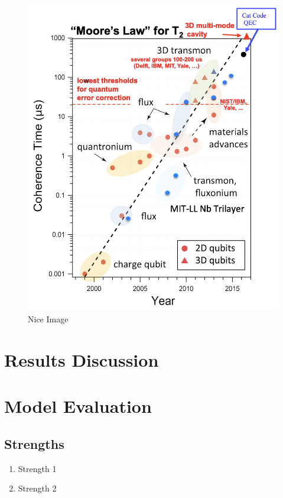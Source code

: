 \documentclass{Setup}
\begin{document}
\newpage 
\begin{figure}[h!]
    \centering
    \includegraphics[width=1.0\textwidth]{../Figures/Nice Image.png}
    \caption{Nice Image} \label{Nice Image}
\end{figure}

\newpage
\lipsum[1-4] %

\section{Results Discussion}
\lipsum[1-3] %


\section{Model Evaluation}
\subsection{Strengths}
\begin{enumerate}
    \item Strength 1
    \item Strength 2
\end{enumerate}
\end{document}
